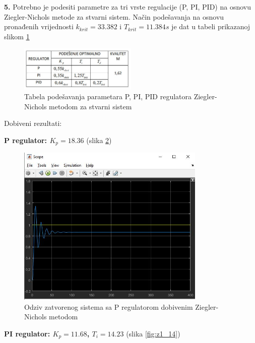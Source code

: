 \textbf{5.}	Potrebno je podesiti parametre za tri vrste regulacije (P, PI, PID) na osnovu Ziegler-Nichols metode za stvarni sistem. Način podešavanja na osnovu pronađenih vrijednosti $k_{krit}=33.382$ i $T_{krit}=11.384s$ je dat u tabeli prikazanoj slikom \ref{fig:z1_12}
 
\begin{figure} [H]
  \centering
  \includegraphics[width=0.5\textwidth]{z1_12}
  \caption{Tabela podešavanja parametara P, PI, PID regulatora Ziegler-Nichols metodom za stvarni sistem}
  \label{fig:z1_12}
\end{figure}

Dobiveni rezultati:

\textbf{P regulator: $K_p=18.36$} (slika \ref{fig:z1_13})

\begin{figure} [H]
  \centering
  \includegraphics[width=0.8\textwidth]{z1_13}
  \caption{Odziv zatvorenog sistema sa P regulatorom dobivenim Ziegler-Nichols metodom}
  \label{fig:z1_13}
\end{figure}

\textbf{PI regulator: $K_p=11.68$, $T_i=14.23$} (slika \ref{fig:z1_14})

